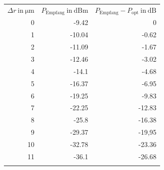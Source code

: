 \begin{table}[H]
  \centering
\begin{tabular}{rrr}
\rowcolor{gray-0}
$\Delta r\ \text{in} \ \si{\micro\meter}$ & $P_{\text{Empfang}} \ \text{in} \ \si{\deci\bel}\text{m}$ & $ P_{\text{Empfang}} - P_{\text{opt}} \ \text{in} \ \si{\deci\bel}$ \\
\cellcolor{gray-0}0         & -9.42                                   & 0                                          \\
\cellcolor{gray-0}1         & -10.04                                  & -0.62                                      \\
\cellcolor{gray-0}2         & -11.09                                  & -1.67                                      \\
\cellcolor{gray-0}3         & -12.46                                  & -3.02                                      \\
\cellcolor{gray-0}4         & -14.1                                   & -4.68                                      \\
\cellcolor{gray-0}5         & -16.37                                  & -6.95                                      \\
\cellcolor{gray-0}6         & -19.25                                  & -9.83                                      \\
\cellcolor{gray-0}7         & -22.25                                  & -12.83                                     \\
\cellcolor{gray-0}8         & -25.8                                   & -16.38                                     \\
\cellcolor{gray-0}9         & -29.37                                  & -19,95                                     \\
\cellcolor{gray-0}10        & -32.78                                  & -23.36                                     \\
\cellcolor{gray-0}11        & -36.1                                   & -26.68                                     \\
                                  &                                         &
\end{tabular}
\end{table}

